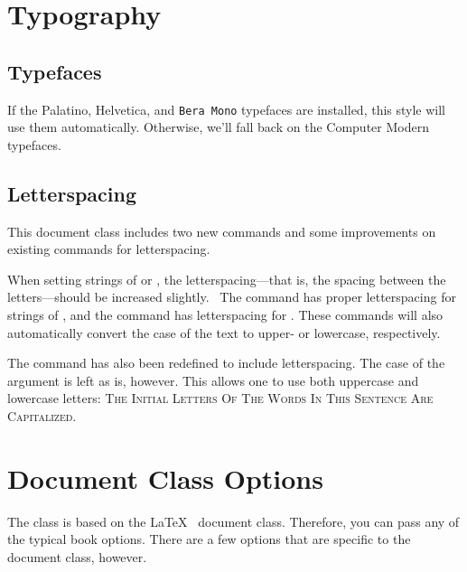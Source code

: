 \begin{fullwidth}
\small\itshape\lipsum[1]
\end{fullwidth}

\section{Typography}\label{sec:typography}

\subsection{Typefaces}\label{sec:typefaces}
If the Palatino, \textsf{Helvetica}, and \texttt{Bera Mono} typefaces are installed, this style
will use them automatically.  Otherwise, we'll fall back on the Computer Modern
typefaces.

\subsection{Letterspacing}\label{sec:letterspacing}
This document class includes two new commands and some improvements on
existing commands for letterspacing.

When setting strings of  or , the
letter\-spacing---that is, the spacing between the letters---should be
increased slightly.~\parencite{Bringhurst2005}  The  command has proper letterspacing for
strings of , and the  command
has letterspacing for .  These commands
will also automatically convert the case of the text to upper- or
lowercase, respectively.

The  command has also been redefined to include
letterspacing.  The case of the  argument is left as is,
however.  This allows one to use both uppercase and lowercase letters:
\textsc{The Initial Letters Of The Words In This Sentence Are Capitalized.}



\section{Document Class Options}\label{sec:options}

The  class is based on the \LaTeX\ 
document class.  Therefore, you can pass any of the typical book
options.  There are a few options that are specific to the
 document class, however.

